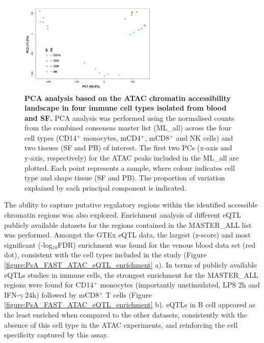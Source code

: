 \begin{figure}[H]
\centering
\includegraphics[width=0.6\textwidth]{./Results3/pdfs/ATAC_PSA_all_DESEq2_PCA}
\caption[PCA analysis based on the ATAC chromatin accessibility landscape in four immune cell types isolated from blood and SF.]{\textbf{PCA analysis based on the ATAC chromatin accessibility landscape in four immune cell types isolated from blood and SF.} PCA analysis was performed using the normalised counts from the combined consensus master list (ML\_all) across the four cell types (CD14$^+$ monocytes, mCD4$^+$, mCD8$^+$ and NK cells) and two tissues (SF and PB) of interest. The first two PCs (x-axis and y-axis, respectively) for the ATAC peaks included in the ML\_all are plotted. Each point represents a sample, where colour indicates cell type and shape tissue (SF and PB). The proportion of variation explained by each principal component is indicated.}
\label{figure:PsA_FAST_ATAC_PCA}
\end{figure}



The ability to capture putative regulatory regions within the identified accessible chromatin regions was also explored. Enrichment analysis of different eQTL publicly available datasets for the regions contained in the MASTER\_ALL list was performed. Amongst the GTEx eQTL data, the largest (z-score) and most significant (-log$_10$FDR) enrichment was found for the venous blood data set (red dot), consistent with the cell types included in the study (Figure \ref{figure:PsA_FAST_ATAC_eQTL_enrichment} a). In terms of publicly available eQTLs studies in immune cells, the strongest enrichment for the MASTER\_ALL regions were found for CD14$^+$ monocytes (importantly unstimulated, LPS 2h and IFN-$\gamma$ 24h) followed by mCD8$^+$ T cells (Figure \ref{figure:PsA_FAST_ATAC_eQTL_enrichment} b). eQTLs in B cell appeared as the least enriched when compared to the other datasets, consistently with the absence of this cell type in the ATAC experiments, and reinforcing the cell specificity captured by this assay.

